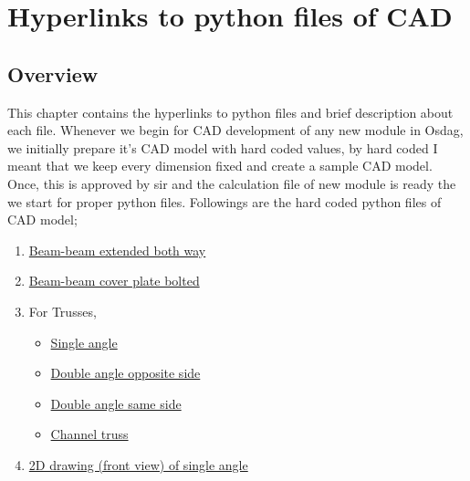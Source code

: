 \chapter{Hyperlinks to python files of CAD}
\section{Overview}
This chapter contains the hyperlinks to python files and brief description about each file.
Whenever we begin for CAD development of any new module in Osdag, we initially prepare it's CAD model with hard coded values, by hard coded I meant that we keep every dimension fixed and create a sample CAD model. Once, this is approved by sir and the calculation file of new module is ready the we start for proper python files.
Followings are the hard coded python files of CAD model;

\begin{enumerate}
	\item \href{https://github.com/chavan-vjti/Osdag_Self/blob/master/Connections/Moment/Beam_Beam/Inputs_For_CAD.py}{Beam-beam extended both way}
	\item \href{https://github.com/chavan-vjti/Osdag\_Self/blob/master/Connections/Moment/Beam\_Beam_cover_plates/cover_plate_calc.py}{Beam-beam cover plate bolted}
	\item For Trusses, 
		\begin{itemize}
			\item \href{https://github.com/chavan-vjti/Osdag_Self/blob/TrussSample/Connections/Truss/SingleAngle.py}{Single angle}
			\item \href{https://github.com/chavan-vjti/Osdag_Self/blob/TrussSample/Connections/Truss/DoubleAngleOpposite.py}{Double angle opposite side}
			\item \href{https://github.com/chavan-vjti/Osdag_Self/blob/TrussSample/Connections/Truss/DoubleAngleSameSide.py}{Double angle same side}
			\item \href{https://github.com/chavan-vjti/Osdag_Self/blob/TrussSample/Connections/Truss/channel_truss.py}{Channel truss}
		\end{itemize}
	\item \href{https://github.com/chavan-vjti/Osdag_Self/blob/truss_drawing/Connections/Truss/drawing_2D/drawing_2D.py}{2D drawing (front view) of single angle}
\end{enumerate}